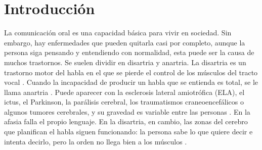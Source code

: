 
\chapter{Introducción}
\label{cap:introduccion}


La comunicación oral es una capacidad básica para vivir en sociedad. Sin embargo, hay enfermedades que pueden quitarla casi por completo, aunque la persona siga pensando y entendiendo con normalidad, esta puede ser la causa de muchos trastornos. Se suelen dividir en disartria y anartria. La disartria es un trastorno motor del habla en el que se pierde el control de los músculos del tracto vocal \cite{enderby2013}. Cuando la incapacidad de producir un habla que se entienda es total, se le llama anartria \cite{silva2024speech}. Puede aparecer con la esclerosis lateral amiotrófica (ELA), el ictus, el Parkinson, la parálisis cerebral, los traumatismos craneoencefálicos o algunos tumores cerebrales, y su gravedad es variable entre las personas \cite{enderby2013,tomik2010,lin2025dysarthria}. En la afasia falla el propio lenguaje. En la disartria, en cambio, las zonas del cerebro que planifican el habla siguen funcionando: la persona sabe lo que quiere decir e intenta decirlo, pero la orden no llega bien a los músculos \cite{silva2024speech}.



